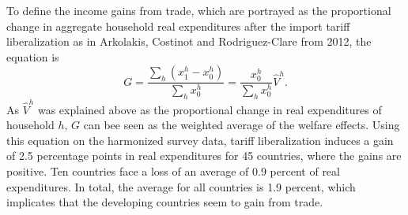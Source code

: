 To define the income gains from trade, which are portrayed as the proportional change in aggregate household real expenditures
after the import tariff liberalization as in Arkolakis, Costinot and Rodriguez-Clare from 2012, the equation is 
\begin{equation} \label{eq:equation12}
    G = \frac{\sum_{h}(x_{1}^h-x_{0}^h)}{\sum_{h}x_{0}^h} = \frac{x_{0}^h}{\sum_{h}x_{0}^h}\hat{V}^h.
\end{equation}
As \(\hat{V}^h\) was explained above as the proportional change in real expenditures of household \(h\), \(G\) can bee seen as 
the weighted average of the welfare effects. Using this equation on the harmonized survey data, tariff liberalization induces 
a gain of 2.5 percentage points in real expenditures for 45 countries, where the gains are positive. Ten countries face a loss of
an average of 0.9 percent of real expenditures. In total, the average for all countries is 1.9 percent, which implicates that
the developing countries seem to gain from trade.

